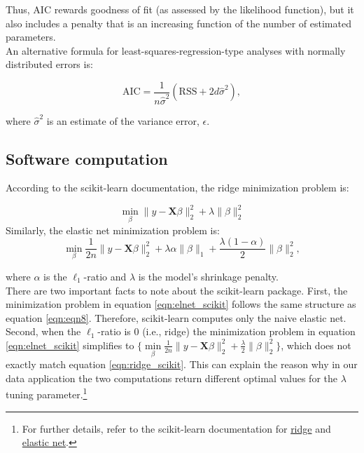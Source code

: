 \noindent Thus, AIC rewards goodness of fit (as assessed by the likelihood function), but it also includes a penalty that is an increasing function of the number of estimated parameters.\\

\noindent An alternative formula for least-squares-regression-type analyses with normally distributed errors is:

\begin{equation}
\mathrm{AIC}=\frac{1}{n \hat{\sigma}^{2}}\left(\mathrm{RSS}+2 d \hat{ \sigma}^{2}\right) ,
\end{equation}

\noindent where $\hat{\sigma}^{2}$ is an estimate of the variance error, $\epsilon$.


\subsection{Software computation}\label{section:software}

\noindent According to the scikit-learn documentation, the ridge minimization problem is:

\begin{equation}
\label{eqn:ridge_scikit}
\underset{\beta}{\operatorname{min}} \|y-\mathbf{X}\beta\|_{2}^{2} + \lambda\|\beta\|_{2}^{2} \end{equation}
Similarly, the elastic net minimization problem is:
\begin{equation}
\label{eqn:elnet_scikit}
\underset{\beta}{\operatorname{min}} \frac{1}{2n}\|y-\mathbf{X}\beta\|_{2}^{2} + \lambda\alpha\|\beta\|_{1} + \frac{\lambda(1-\alpha)}{2}\|\beta\|_{2}^{2},   
\end{equation}

\noindent where $\alpha$ is the $\ell_1$-ratio and $\lambda$ is the model's shrinkage penalty.\\

\noindent There are two important facts to note about the scikit-learn package. First, the minimization problem in equation \eqref{eqn:elnet_scikit} follows the same structure as equation \eqref{eqn:eqn8}. Therefore, scikit-learn computes only the naive elastic net. Second, when the $\ell_1$-ratio is 0 (i.e., ridge) the minimization problem in equation \eqref{eqn:elnet_scikit} simplifies to
$\Big\{\underset{\beta}{\operatorname{min}} \frac{1}{2n}\|y-\mathbf{X}\beta\|_{2}^{2} +  \frac{\lambda}{2}\|\beta\|_{2}^{2}\Big\}$, which does not exactly match equation \eqref{eqn:ridge_scikit}. This can explain the reason why in our data application the two computations return different optimal values for the $\lambda$ tuning parameter.\footnote{For further details, refer to the scikit-learn documentation for \href{https://scikit-learn.org/stable/modules/generated/sklearn.linear_model.Ridge.html}{ridge} and \href{https://scikit-learn.org/stable/modules/generated/sklearn.linear_model.ElasticNet.html}{elastic net}.}








